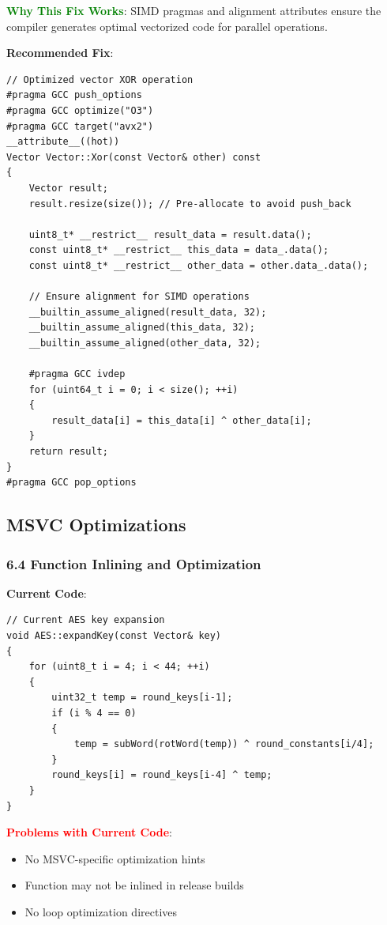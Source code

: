 \documentclass[11pt,a4paper]{article}
\begin{document}
\textcolor{green}{\textbf{Why This Fix Works}}: SIMD pragmas and alignment attributes ensure the compiler generates optimal vectorized code for parallel operations.

\textbf{Recommended Fix}:
\begin{lstlisting}
// Optimized vector XOR operation
#pragma GCC push_options
#pragma GCC optimize("O3")
#pragma GCC target("avx2")
__attribute__((hot))
Vector Vector::Xor(const Vector& other) const
{
    Vector result;
    result.resize(size()); // Pre-allocate to avoid push_back
    
    uint8_t* __restrict__ result_data = result.data();
    const uint8_t* __restrict__ this_data = data_.data();
    const uint8_t* __restrict__ other_data = other.data_.data();
    
    // Ensure alignment for SIMD operations
    __builtin_assume_aligned(result_data, 32);
    __builtin_assume_aligned(this_data, 32);
    __builtin_assume_aligned(other_data, 32);
    
    #pragma GCC ivdep
    for (uint64_t i = 0; i < size(); ++i)
    {
        result_data[i] = this_data[i] ^ other_data[i];
    }
    return result;
}
#pragma GCC pop_options
\end{lstlisting}

\subsection{MSVC Optimizations}

\subsubsection{6.4 Function Inlining and Optimization}

\textbf{Current Code}:
\begin{lstlisting}
// Current AES key expansion
void AES::expandKey(const Vector& key)
{
    for (uint8_t i = 4; i < 44; ++i)
    {
        uint32_t temp = round_keys[i-1];
        if (i % 4 == 0)
        {
            temp = subWord(rotWord(temp)) ^ round_constants[i/4];
        }
        round_keys[i] = round_keys[i-4] ^ temp;
    }
}
\end{lstlisting}

\textcolor{red}{\textbf{Problems with Current Code}}:
\begin{itemize}
    \item No MSVC-specific optimization hints
    \item Function may not be inlined in release builds
    \item No loop optimization directives
\end{itemize}
\end{document}
